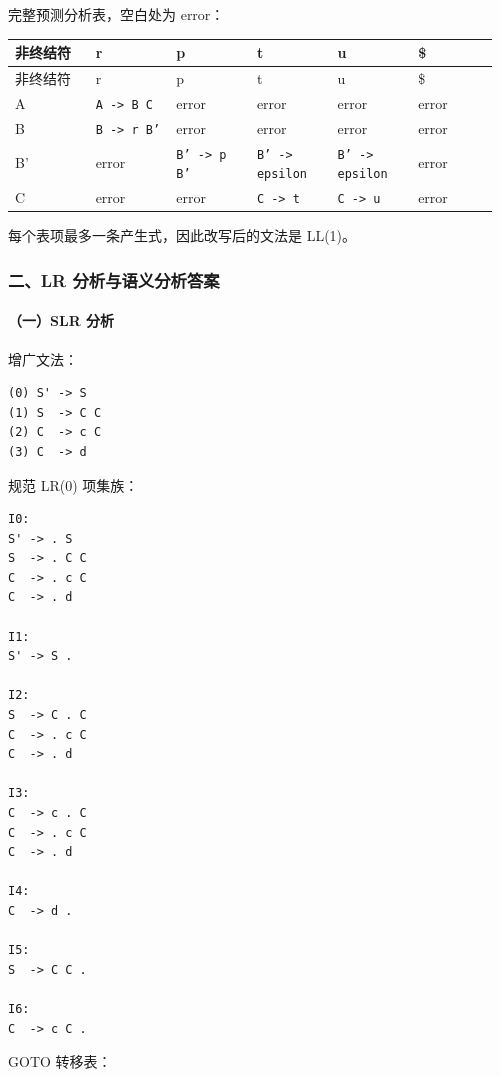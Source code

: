 \documentclass[UTF8]{ctexart}
\begin{document}
完整预测分析表，空白处为 error：

\begin{longtable}{|p{0.16\linewidth}|p{0.16\linewidth}|p{0.16\linewidth}|p{0.16\linewidth}|p{0.16\linewidth}|p{0.16\linewidth}|}
\hline
非终结符 & r & p & t & u & \$ \\
\hline
\endfirsthead
非终结符 & r & p & t & u & \$ \\
\hline
\endhead
A & \texttt{A -> B C} & error & error & error & error \\
\hline
B & \texttt{B -> r B'} & error & error & error & error \\
\hline
B' & error & \texttt{B' -> p B'} & \texttt{B' -> epsilon} & \texttt{B' -> epsilon} & error \\
\hline
C & error & error & \texttt{C -> t} & \texttt{C -> u} & error \\
\hline
\end{longtable}

每个表项最多一条产生式，因此改写后的文法是 LL(1)。

\subsubsection*{二、LR 分析与语义分析答案}

\paragraph*{（一）SLR 分析}

增广文法：

\begin{Verbatim}[fontsize=\small,breaklines=true]
(0) S' -> S
(1) S  -> C C
(2) C  -> c C
(3) C  -> d
\end{Verbatim}

规范 LR(0) 项集族：

\begin{Verbatim}[fontsize=\small,breaklines=true]
I0:
S' -> . S
S  -> . C C
C  -> . c C
C  -> . d

I1:
S' -> S .

I2:
S  -> C . C
C  -> . c C
C  -> . d

I3:
C  -> c . C
C  -> . c C
C  -> . d

I4:
C  -> d .

I5:
S  -> C C .

I6:
C  -> c C .
\end{Verbatim}

GOTO 转移表：
\end{document}
